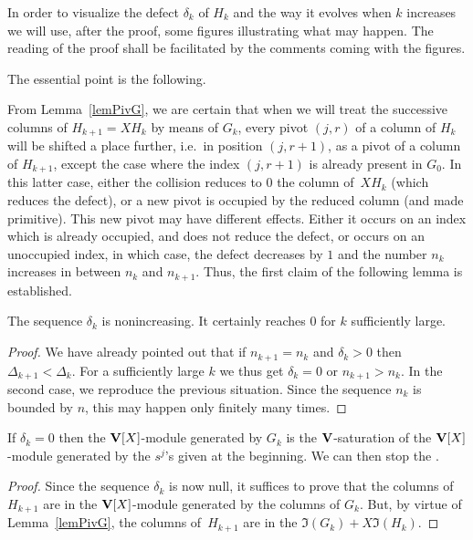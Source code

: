\medskip
In order to visualize the defect $\delta_k$ of $H_k$ and  the way  it evolves
when $k$ increases we will use, after the proof, some
 figures illustrating what may happen. The reading of the proof shall be facilitated by the comments coming with the figures.

The essential point is the following.

From Lemma~\ref{lemPivG}, we are certain  that when we will treat the successive columns of $H_{k+1}=XH_k$ by means of $G_k$,
every pivot  $(j,r)$ of a column of $H_k$ will be shifted a place further,
i.e.\ in position $(j,r+1)$, as a pivot
of a column  of $H_{k+1}$, except  the case where the index
$(j,r+1)$ is already present in   $G_0$.
In this latter case, either the collision reduces to $0$ the column
of~$XH_k$ (which reduces the defect), or a new pivot  is occupied by the reduced   column 
(and made primitive). This new pivot  may have different effects.
Either it occurs on an  index which is already occupied, and does not reduce the defect, or occurs on an unoccupied  index, in which case,
the defect decreases by $1$ and the number $n_k$ increases in between   $n_k$ and $n_{k+1}$.
Thus, the first  claim of the following lemma is established.


\begin{lemma} \label{lemFinDeLalgoCertaine}
The sequence $\delta_k$ is nonincreasing. It certainly reaches  $0$ for $k$ sufficiently large.
\end{lemma}
%
\begin{proof}{}
We have already pointed out that if $n_{k+1}=n_k$ and $\delta_k>0$ then $\Delta_{k+1}<\Delta_k$. For a sufficiently large $k$ we thus get  $\delta_k=0$
or $n_{k+1}>n_k$. In the second case, we reproduce the previous  situation.
Since the sequence $n_k$ is bounded by $n$, this may happen only finitely many times.
\end{proof}
%

\begin{lemma} \label{lemFinDeLalgoCorrect}
If $\delta_k=0$ then the $\mathbf{V}[X]$-module generated by $G_k$ is the $\mathbf{V}$-saturation of the
$\mathbf{V}[X]$-module generated by the $s^j$’s given at the beginning. We can then stop the \algo.
\end{lemma}
%
\begin{proof}{}
Since the sequence $\delta_k$ is now null, it suffices to prove that
the columns of $H_{k+1}$ are in the $\mathbf{V}[X]$-module generated by the 
columns of $G_k$. But, by virtue of  Lemma~\ref{lemPivG}, the columns of~$H_{k+1}$
are in the  \Vmo $\Im(G_k)+X\Im(H_k)$.
\end{proof}
%

